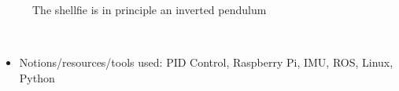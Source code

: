{\begin{minipage}{\linewidth}
\begin{minipage}{0.45\linewidth}
\begin{figure}[H]
      \caption{\small The shellfie is in principle an inverted pendulum}
      \label{fig:shellfie_schem}
    \end{figure}
  \end{minipage}
\end{minipage}
}\\

\begin{itemize}
  \item Notions/resources/tools used: PID Control, Raspberry Pi, IMU, ROS, Linux, Python
\end{itemize}
